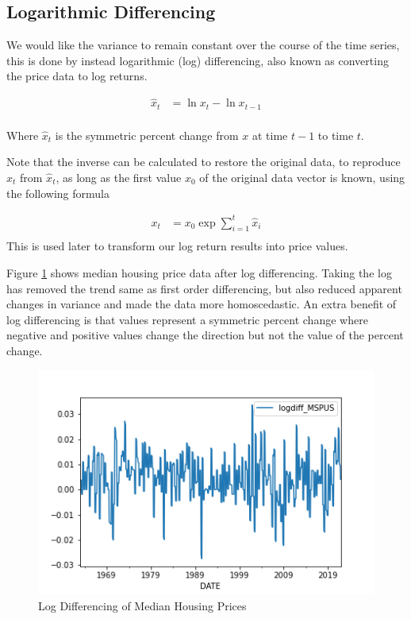 \documentclass [MS] {uclathes}
\begin{document}
\subsection{Logarithmic Differencing}

We would like the variance to remain constant over the course of the time series, this is done by instead logarithmic (log) differencing, also known as converting the price data to log returns.

$$
\begin{aligned}
\hat{x}_{t} &= \ln{x_{t}} - \ln{x_{t-1}} \\
\end{aligned}
$$

Where $\hat{x}_{t}$ is the symmetric percent change from $x$ at time $t-1$ to time $t$.


Note that the inverse can be calculated to restore the original data, to reproduce $x_{t}$ from $\hat{x}_{t}$, as long as the first value $x_0$ of the original data vector is known, using the following formula

$$
\begin{aligned}
x_{t} &= {x_{0}} \exp{\sum_{i=1}^{t}{\hat{x}_i}} \\
\end{aligned}
$$
This is used later to transform our log return results into price values.

Figure \ref{fig:logdiff_mspus} shows median housing price data after log differencing. Taking the log has removed the trend same as first order differencing, but also reduced apparent changes in variance and made the data more homoscedastic. An extra benefit of log differencing is that values represent a symmetric percent change where negative and positive values change the direction but not the value of the percent change.\cite{cole_statistics_2017}

\begin{figure}[h!]
    \centering
    \includegraphics[scale=0.75]{figures/logdiff_MSPUS.png}
    \caption{Log Differencing of Median Housing Prices}
    \label{fig:logdiff_mspus}
\end{figure}
\end{document}
